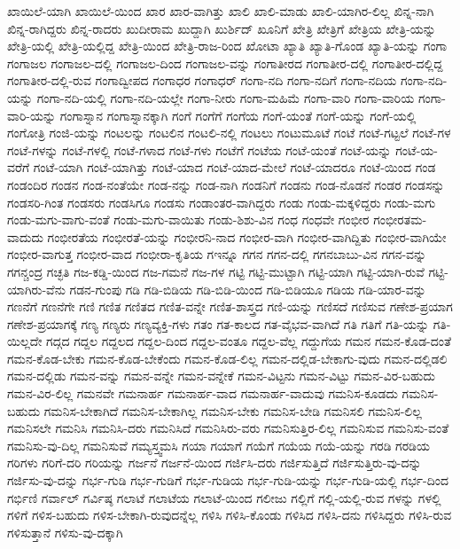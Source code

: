 {ಖಾಯಿಲೆ-ಯಾಗಿ
ಖಾಯಿಲೆ-ಯಿಂದ
ಖಾರ
ಖಾರ-ವಾಗಿತ್ತು
ಖಾಲಿ
ಖಾಲಿ-ಮಾಡು
ಖಾಲಿ-ಯಾಗಿರ-ಲಿಲ್ಲ
ಖಿನ್ನ-ನಾಗಿ
ಖಿನ್ನ-ರಾಗಿದ್ದರು
ಖಿನ್ನ-ರಾದರು
ಖುದೀರಾಮ
ಖುದ್ದಾಗಿ
ಖುರ್ಶಿದ್
ಖೂನಿಗೆ
ಖೇತ್ರಿ
ಖೇತ್ರಿಗೆ
ಖೇತ್ರಿಯ
ಖೇತ್ರಿ-ಯನ್ನು
ಖೇತ್ರಿ-ಯಲ್ಲಿ
ಖೇತ್ರಿ-ಯಲ್ಲಿದ್ದ
ಖೇತ್ರಿ-ಯಿಂದ
ಖೇತ್ರಿ-ರಾಜ-ರಿಂದ
ಖೋಟಾ
ಖ್ಯಾತಿ
ಖ್ಯಾತಿ-ಗೊಂಡ
ಖ್ಯಾತಿ-ಯನ್ನು
ಗಂಗಾ
ಗಂಗಾಜಲ
ಗಂಗಾಜಲ-ದಲ್ಲಿ
ಗಂಗಾಜಲ-ದಿಂದ
ಗಂಗಾಜಲ-ವನ್ನು
ಗಂಗಾತೀರದ
ಗಂಗಾತೀರ-ದಲ್ಲಿ
ಗಂಗಾತೀರ-ದಲ್ಲಿದ್ದ
ಗಂಗಾತೀರ-ದಲ್ಲಿ-ರುವ
ಗಂಗಾದ್ವೀಪದ
ಗಂಗಾಧರ
ಗಂಗಾಧರ್
ಗಂಗಾ-ನದಿ
ಗಂಗಾ-ನದಿಗೆ
ಗಂಗಾ-ನದಿಯ
ಗಂಗಾ-ನದಿ-ಯನ್ನು
ಗಂಗಾ-ನದಿ-ಯಲ್ಲಿ
ಗಂಗಾ-ನದಿ-ಯಲ್ಲೇ
ಗಂಗಾ-ನೀರು
ಗಂಗಾ-ಮಹಿಮೆ
ಗಂಗಾ-ವಾರಿ
ಗಂಗಾ-ವಾರಿಯ
ಗಂಗಾ-ವಾರಿ-ಯನ್ನು
ಗಂಗಾಸ್ನಾನ
ಗಂಗಾಸ್ನಾನಕ್ಕಾಗಿ
ಗಂಗೆ
ಗಂಗೆಗೆ
ಗಂಗೆಯ
ಗಂಗೆ-ಯಂತೆ
ಗಂಗೆ-ಯನ್ನು
ಗಂಗೆ-ಯಲ್ಲಿ
ಗಂಗೋತ್ರಿ
ಗಂಜಿ-ಯನ್ನು
ಗಂಟಲನ್ನು
ಗಂಟಲಿನ
ಗಂಟಲಿ-ನಲ್ಲಿ
ಗಂಟಲು
ಗಂಟುಮೂಟೆ
ಗಂಟೆ
ಗಂಟೆ-ಗಟ್ಟಲೆ
ಗಂಟೆ-ಗಳ
ಗಂಟೆ-ಗಳನ್ನು
ಗಂಟೆ-ಗಳಲ್ಲಿ
ಗಂಟೆ-ಗಳಾದ
ಗಂಟೆ-ಗಳು
ಗಂಟೆಗೆ
ಗಂಟೆಯ
ಗಂಟೆ-ಯಂತೆ
ಗಂಟೆ-ಯನ್ನು
ಗಂಟೆ-ಯ-ವರೆಗೆ
ಗಂಟೆ-ಯಾಗಿ
ಗಂಟೆ-ಯಾಗಿತ್ತು
ಗಂಟೆ-ಯಾದ
ಗಂಟೆ-ಯಾದ-ಮೇಲೆ
ಗಂಟೆ-ಯಾದರೂ
ಗಂಟೆ-ಯಿಂದ
ಗಂಡ
ಗಂಡಂದಿರ
ಗಂಡನ
ಗಂಡ-ನಂತೆಯೇ
ಗಂಡ-ನನ್ನು
ಗಂಡ-ನಾಗಿ
ಗಂಡನಿಗೆ
ಗಂಡನು
ಗಂಡ-ನೊಡನೆ
ಗಂಡರ
ಗಂಡಸನ್ನು
ಗಂಡಸರಿ-ಗಿಂತ
ಗಂಡಸರು
ಗಂಡಸಿಗೂ
ಗಂಡಸು
ಗಂಡಾಂತರ-ವಾಗಿದ್ದರು
ಗಂಡು
ಗಂಡು-ಮಕ್ಕಳಿದ್ದರು
ಗಂಡು-ಮಗು
ಗಂಡು-ಮಗು-ವಾಗು-ವಂತೆ
ಗಂಡು-ಮಗು-ವಾಯಿತು
ಗಂಡು-ಶಿಶು-ವಿನ
ಗಂಧ
ಗಂಧವೇ
ಗಂಭೀರ
ಗಂಭೀರತಮ-ವಾದುದು
ಗಂಭೀರತೆಯ
ಗಂಭೀರತೆ-ಯನ್ನು
ಗಂಭೀರನಿ-ನಾದ
ಗಂಭೀರ-ವಾಗಿ
ಗಂಭೀರ-ವಾಗಿದ್ದಿತು
ಗಂಭೀರ-ವಾಗಿಯೇ
ಗಂಭೀರ-ವಾಗುತ್ತ
ಗಂಭೀರ-ವಾದ
ಗಂಭೀರಾ-ಕೃತಿಯ
ಗಇನ್ನೂ
ಗಗನ
ಗಗನ-ದಲ್ಲಿ
ಗಗನಬಾಬು-ವಿನ
ಗಗನ-ವನ್ನು
ಗಗನ್ಚಂದ್ರ
ಗಚ್ಛತಿ
ಗಜ-ಕಡ್ಡಿ-ಯಿಂದ
ಗಜ-ಗಮನೆ
ಗಜ-ಗಳ
ಗಟ್ಟಿ
ಗಟ್ಟಿ-ಮುಟ್ಟಾಗಿ
ಗಟ್ಟಿ-ಯಾಗಿ
ಗಟ್ಟಿ-ಯಾಗಿ-ರುವೆ
ಗಟ್ಟಿ-ಯಾಗಿರು-ವೆನು
ಗಡನ-ಗುಂಪು
ಗಡಿ
ಗಡಿ-ಬಿಡಿಯ
ಗಡಿ-ಬಿಡಿ-ಯಿಂದ
ಗಡಿ-ಬಿಡಿಯೂ
ಗಡಿಯ
ಗಡಿ-ಯಾರ-ವನ್ನು
ಗಣನೆಗೆ
ಗಣನೆಗೇ
ಗಣಿ
ಗಣಿತ
ಗಣಿತದ
ಗಣಿತ-ವನ್ನೇ
ಗಣಿತ-ಶಾಸ್ತ್ರದ
ಗಣಿ-ಯನ್ನು
ಗಣಿಸದೆ
ಗಣಿಸುವ
ಗಣೇಶ-ಪ್ರಯಾಗ
ಗಣೇಶ-ಪ್ರಯಾಗಕ್ಕೆ
ಗಣ್ಯ
ಗಣ್ಯರು
ಗಣ್ಯವ್ಯಕ್ತಿ-ಗಳು
ಗತಂ
ಗತ-ಕಾಲದ
ಗತ-ವೈಭವ-ವಾಗಿದೆ
ಗತಿ
ಗತಿಗೆ
ಗತಿ-ಯನ್ನು
ಗತಿ-ಯಿಲ್ಲದೇ
ಗದ್ಗದ
ಗದ್ದಲ
ಗದ್ದಲದ
ಗದ್ದಲ-ದಿಂದ
ಗದ್ದಲ-ವಂತೂ
ಗದ್ದಲ-ವೆಲ್ಲ
ಗದ್ದುಗೆಯ
ಗಮನ
ಗಮನ-ಕೊಡ-ದಂತೆ
ಗಮನ-ಕೊಡ-ಬೇಕು
ಗಮನ-ಕೊಡ-ಬೇಕೆಂದು
ಗಮನ-ಕೊಡ-ಲಿಲ್ಲ
ಗಮನ-ದಲ್ಲಿಡ-ಬೇಕಾಗು-ವುದು
ಗಮನ-ದಲ್ಲಿಡಲಿ
ಗಮನ-ದಲ್ಲಿಡು
ಗಮನ-ವನ್ನು
ಗಮನ-ವನ್ನೇ
ಗಮನ-ವನ್ನೇಕೆ
ಗಮನ-ವಿಟ್ಟನು
ಗಮನ-ವಿಟ್ಟು
ಗಮನ-ವಿರ-ಬಹುದು
ಗಮನ-ವಿರ-ಲಿಲ್ಲ
ಗಮನವೇ
ಗಮನಾರ್ಹ
ಗಮನಾರ್ಹ-ವಾದ
ಗಮನಾರ್ಹ-ವಾದುವು
ಗಮನಿಸ-ಕೂಡದು
ಗಮನಿಸ-ಬಹುದು
ಗಮನಿಸ-ಬೇಕಾಗಿದೆ
ಗಮನಿಸ-ಬೇಕಾಗಿಲ್ಲ
ಗಮನಿಸ-ಬೇಕು
ಗಮನಿಸ-ಬೇಡಿ
ಗಮನಿಸಲಿ
ಗಮನಿಸ-ಲಿಲ್ಲ
ಗಮನಿಸಲೇ
ಗಮನಿಸಿ
ಗಮನಿಸಿ-ದರು
ಗಮನಿಸಿದೆ
ಗಮನಿಸಿರು-ವರು
ಗಮನಿಸುತ್ತಿರ-ಲಿಲ್ಲ
ಗಮನಿಸುವ
ಗಮನಿಸು-ವಂತೆ
ಗಮನಿಸು-ವು-ದಿಲ್ಲ
ಗಮನಿಸುವೆ
ಗಮ್ಯಸ್ತ್ವಮಸಿ
ಗಯಾ
ಗಯಾಗೆ
ಗಯೆಗೆ
ಗಯೆಯ
ಗಯೆ-ಯನ್ನು
ಗರಡಿ
ಗರಡಿಯ
ಗರಿಗಳು
ಗರಿಗೆ-ದರಿ
ಗರಿಯನ್ನು
ಗರ್ಜನೆ
ಗರ್ಜನೆ-ಯಿಂದ
ಗರ್ಜಿಸಿ-ದರು
ಗರ್ಜಿಸುತ್ತಿದೆ
ಗರ್ಜಿಸುತ್ತಿರು-ವು-ದನ್ನು
ಗರ್ಜಿಸು-ವು-ದನ್ನು
ಗರ್ಭ-ಗುಡಿ
ಗರ್ಭ-ಗುಡಿಗೆ
ಗರ್ಭ-ಗುಡಿಯ
ಗರ್ಭ-ಗುಡಿ-ಯನ್ನು
ಗರ್ಭ-ಗುಡಿ-ಯಲ್ಲಿ
ಗರ್ಭ-ದಿಂದ
ಗರ್ಭಿಣಿ
ಗರ್ವಾಲ್
ಗರ್ವಿಷ್ಠ
ಗಲಾಟೆ
ಗಲಾಟೆಯ
ಗಲಾಟೆ-ಯಿಂದ
ಗಲೀಜು
ಗಲ್ಲಿಗೆ
ಗಲ್ಲಿ-ಯಲ್ಲಿ-ರುವ
ಗಳನ್ನು
ಗಳಲ್ಲಿ
ಗಳಿಗೆ
ಗಳಿಸ-ಬಹುದು
ಗಳಿಸ-ಬೇಕಾಗಿ-ರುವುದನ್ನೆಲ್ಲ
ಗಳಿಸಿ
ಗಳಿಸಿ-ಕೊಂಡು
ಗಳಿಸಿದ
ಗಳಿಸಿ-ದನು
ಗಳಿಸಿದ್ದರು
ಗಳಿಸಿ-ರುವ
ಗಳಿಸುತ್ತಾನೆ
ಗಳಿಸು-ವು-ದಕ್ಕಾಗಿ
}
